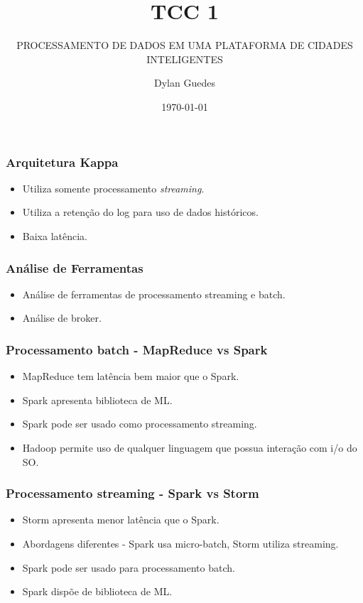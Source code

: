 \documentclass{beamer}
\title{TCC 1}
\subtitle{PROCESSAMENTO DE DADOS EM UMA PLATAFORMA DE CIDADES INTELIGENTES}
\author{Dylan Guedes}
\institute{UnB Gama}
\date{\today}
\begin{document}
  
  
  
  
  
  
  
  
  
  
  

  \begin{frame}
      \frametitle{Arquitetura Kappa}
      \begin{itemize}
          \item Utiliza somente processamento \textit{streaming}.
          \item Utiliza a retenção do log para uso de dados históricos.
          \item Baixa latência.
      \end{itemize}
  \end{frame}

  \begin{frame}
      \frametitle{Análise de Ferramentas}
      \begin{itemize}
          \item Análise de ferramentas de processamento streaming e batch.
          \item Análise de broker.
      \end{itemize}
  \end{frame}

  \begin{frame}
      \frametitle{Processamento batch - MapReduce vs Spark}
      \begin{itemize}
          \item MapReduce tem latência bem maior que o Spark.
          \item Spark apresenta biblioteca de ML.
          \item Spark pode ser usado como processamento streaming.
          \item Hadoop permite uso de qualquer linguagem que possua interação
              com i/o do SO.
      \end{itemize}
  \end{frame}

  \begin{frame}
      \frametitle{Processamento streaming - Spark vs Storm}
      \begin{itemize}
          \item Storm apresenta menor latência que o Spark.
          \item Abordagens diferentes - Spark usa micro-batch, Storm utiliza
              streaming.
          \item Spark pode ser usado para processamento batch.
          \item Spark dispõe de biblioteca de ML.
      \end{itemize}
  \end{frame}
\end{document}
